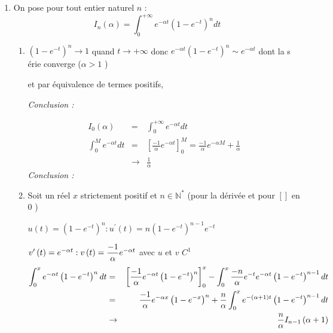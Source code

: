\documentclass[a4paper, 11pt,reqno]{article}
\begin{document}
\begin{enumerate}
\item On pose pour tout entier naturel $n$ : 
\begin{equation*}
I_{n}\left( \alpha \right) =\int_{0}^{+\infty }e^{-\alpha t}\left(
1-e^{-t}\right) ^{n}dt
\end{equation*}

\begin{enumerate}
\item $\left( 1-e^{-t}\right) ^{n}\rightarrow 1$ quand $t\rightarrow +\infty 
$ donc $e^{-\alpha t}\left( 1-e^{-t}\right) ^{n}\sim e^{-\alpha t}$ dont la s%
\'{e}rie converge ($\alpha >1$ )

et par \'{e}quivalence de termes positifs, 

\textsl{Conclusion : }

\begin{eqnarray*}
I_{0}\left( \alpha \right)  &=&\int_{0}^{+\infty }e^{-\alpha t}dt \\
\int_{0}^{M}e^{-\alpha t}dt &=&\left[ \frac{-1}{\alpha }e^{-\alpha t}\right]
_{0}^{M}=\frac{-1}{\alpha }e^{-\alpha M}+\frac{1}{\alpha } \\
&\rightarrow &\frac{1}{\alpha }
\end{eqnarray*}%
\textsl{Conclusion : }

\item Soit un r\'{e}el $x$ strictement positif et $n\in \mathbb{N}^{\ast }$
(pour la d\'{e}riv\'{e}e et pour $\left[ {}\right] $ en $0$ )

$u\left( t\right) =\left( 1-e^{-t}\right) ^{n}:u^{\prime }\left( t\right)
=n\left( 1-e^{-t}\right) ^{n-1}e^{-t}$

$v^{\prime }\left( t\right) =e^{-\alpha t}:v\left( t\right) =\dfrac{-1}{%
\alpha }e^{-\alpha t}$ avec $u$ et $v$ $C^{1}$%
\begin{eqnarray*}
\int_{0}^{x}e^{-\alpha t}\left( 1-e^{-t}\right) ^{n}dt &=&\left[ \dfrac{-1}{%
\alpha }e^{-\alpha t}\left( 1-e^{-t}\right) ^{n}\right] _{0}^{x}-\int_{0}^{x}%
\dfrac{-n}{\alpha }e^{-t}e^{-\alpha t}\left( 1-e^{-t}\right) ^{n-1}dt \\
&=&\dfrac{-1}{\alpha }e^{-\alpha x}\left( 1-e^{-x}\right) ^{n}+\dfrac{n}{%
\alpha }\int_{0}^{x}e^{-\left( \alpha +1\right) t}\left( 1-e^{-t}\right)
^{n-1}dt \\
&\rightarrow &\dfrac{n}{\alpha }I_{n-1}\left( \alpha +1\right) 
\end{eqnarray*}


\end{enumerate}
\end{enumerate}
\end{document}
